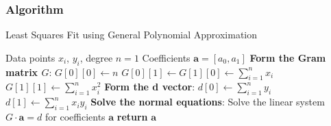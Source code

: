 \documentclass[10pt]{article}
\begin{document}
\subsubsection{Algorithm}
\begin{algorithm}[H]
\caption{Least Squares Fit using General Polynomial Approximation}\label{alg:least_squares}
\begin{algorithmic}
\Require Data points $x_i$, $y_i$, degree $n=1$
\Ensure Coefficients $\mathbf{a} = [a_0, a_1]$
\State \textbf{Form the Gram matrix $G$}:
\State $G[0][0] \gets n$
\State $G[0][1] \gets G[1][0] \gets \sum_{i=1}^{n} x_i$
\State $G[1][1] \gets \sum_{i=1}^{n} x_i^2$
\State \textbf{Form the d vector}:
\State $d[0] \gets \sum_{i=1}^{n} y_i$
\State $d[1] \gets \sum_{i=1}^{n} x_i y_i$
\State \textbf{Solve the normal equations}:
\State Solve the linear system $G \cdot \mathbf{a} = d$ for coefficients $\mathbf{a}$
\State \textbf{return} $\mathbf{a}$
\end{algorithmic}
\end{algorithm}
\end{document}
